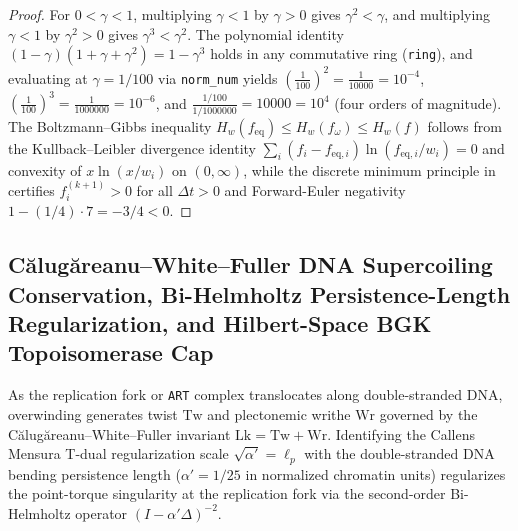 \documentclass[11pt,a4paper]{article}
\theoremstyle{definition}
\begin{document}
\begin{proof}
For $0 < \gamma < 1$, multiplying $\gamma < 1$ by $\gamma > 0$ gives $\gamma^2 < \gamma$, and multiplying $\gamma < 1$ by $\gamma^2 > 0$ gives $\gamma^3 < \gamma^2$. The polynomial identity $(1-\gamma)(1+\gamma+\gamma^2) = 1 - \gamma^3$ holds in any commutative ring (\texttt{ring}), and evaluating at $\gamma = 1/100$ via \texttt{norm\_num} yields $\left(\frac{1}{100}\right)^2 = \frac{1}{10000} = 10^{-4}$, $\left(\frac{1}{100}\right)^3 = \frac{1}{1000000} = 10^{-6}$, and $\frac{1/100}{1/1000000} = 10000 = 10^4$ (four orders of magnitude). The Boltzmann--Gibbs inequality $H_w(f_{\mathrm{eq}}) \le H_w(f_\omega) \le H_w(f)$ follows from the Kullback--Leibler divergence identity $\sum_i (f_i - f_{\mathrm{eq},i})\ln(f_{\mathrm{eq},i}/w_i) = 0$ and convexity of $x\ln(x/w_i)$ on $(0,\infty)$, while the discrete minimum principle in  certifies $f_i^{(k+1)} > 0$ for all $\Delta t > 0$ and Forward-Euler negativity $1 - (1/4)\cdot 7 = -3/4 < 0$.
\end{proof}

\subsection{C\u{a}lug\u{a}reanu--White--Fuller DNA Supercoiling Conservation, Bi-Helmholtz Persistence-Length Regularization, and Hilbert-Space BGK Topoisomerase Cap}

As the replication fork or \texttt{ART} complex translocates along double-stranded DNA, overwinding generates twist $\mathrm{Tw}$ and plectonemic writhe $\mathrm{Wr}$ governed by the C\u{a}lug\u{a}reanu--White--Fuller invariant $\mathrm{Lk} = \mathrm{Tw} + \mathrm{Wr}$. Identifying the Callens Mensura T-dual regularization scale $\sqrt{\alpha'} = \ell_p$ with the double-stranded DNA bending persistence length ($\alpha' = 1/25$ in normalized chromatin units) regularizes the point-torque singularity at the replication fork via the second-order Bi-Helmholtz operator $(I - \alpha'\Delta)^{-2}$.
\end{document}
